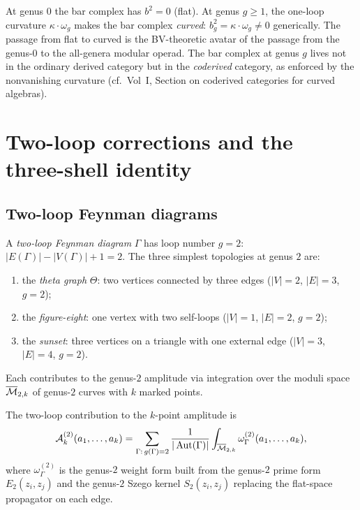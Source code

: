 \begin{remark}
At genus $0$ the bar complex has $b^2 = 0$ (flat). At genus
$g \ge 1$, the one-loop curvature $\kappa \cdot \omega_g$ makes
the bar complex \emph{curved}: $b_g^2 = \kappa \cdot \omega_g
\ne 0$ generically. The passage from flat to curved is the
BV-theoretic avatar of the passage from the genus-$0$ to the
all-genera modular operad. The bar complex at genus $g$ lives
not in the ordinary derived category but in the
\emph{coderived} category, as enforced by the nonvanishing
curvature (cf.\ Vol~I, Section on coderived categories for
curved algebras).
\end{remark}


\section{Two-loop corrections and the three-shell identity}

\subsection{Two-loop Feynman diagrams}

\begin{definition}
A \emph{two-loop Feynman diagram} $\Gamma$ has loop number
$g = 2$: $|E(\Gamma)| - |V(\Gamma)| + 1 = 2$. The three
simplest topologies at genus $2$ are:
\begin{enumerate}[label=(\alph*)]
\item the \emph{theta graph} $\Theta$: two vertices connected by
 three edges ($|V| = 2$, $|E| = 3$, $g = 2$);
\item the \emph{figure-eight}: one vertex with two self-loops
 ($|V| = 1$, $|E| = 2$, $g = 2$);
\item the \emph{sunset}: three vertices on a triangle with one
 external edge ($|V| = 3$, $|E| = 4$, $g = 2$).
\end{enumerate}
Each contributes to the genus-$2$ amplitude via integration over
the moduli space $\overline{\mathcal{M}}_{2,k}$ of genus-$2$ curves
with $k$ marked points.
\end{definition}

\begin{proposition}
The two-loop contribution to the $k$-point amplitude is
\begin{equation}
\mathcal{A}_k^{(2)}(a_1, \ldots, a_k)
= \sum_{\Gamma:\, g(\Gamma) = 2}
\frac{1}{|\operatorname{Aut}(\Gamma)|}
\int_{\overline{\mathcal{M}}_{2,k}}
\omega_\Gamma^{(2)}(a_1, \ldots, a_k),
\end{equation}
where $\omega_\Gamma^{(2)}$ is the genus-$2$ weight form built from
the genus-$2$ prime form $E_2(z_i, z_j)$ and the genus-$2$ Szego
kernel $S_2(z_i, z_j)$ replacing the flat-space propagator on each
edge.
\end{proposition}

